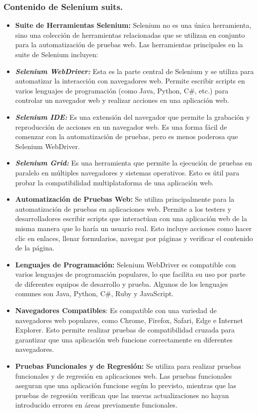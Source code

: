 \documentclass[letterpaper]{article}
\begin{document}
\subsubsection{Contenido de Selenium suits.}
\begin{itemize}[series=listWWNumxii,]
\item \textbf{Suite de Herramientas Selenium:} Selenium no es una única herramienta, sino una colección de herramientas
relacionadas que se utilizan en conjunto para la automatización de pruebas web. Las herramientas principales en la
suite de Selenium incluyen:
\item \textbf{\textit{Selenium WebDriver: }}Esta es la parte central de Selenium y se utiliza para automatizar la
interacción con navegadores web. Permite escribir scripts en varios lenguajes de programación (como Java, Python, C\#,
etc.) para controlar un navegador web y realizar acciones en una aplicación web.
\item \textbf{\textit{Selenium IDE: }}Es una extensión del navegador que permite la grabación y reproducción de acciones
en un navegador web. Es una forma fácil de comenzar con la automatización de pruebas, pero es menos poderosa que
Selenium WebDriver.
\item \textbf{\textit{Selenium Grid: }}Es una herramienta que permite la ejecución de pruebas en paralelo en múltiples
navegadores y sistemas operativos. Esto es útil para probar la compatibilidad multiplataforma de una aplicación web.
\item \textbf{Automatización de Pruebas Web:} Se utiliza principalmente para la automatización de pruebas en
aplicaciones web. Permite a los testers y desarrolladores escribir scripts que interactúan con una aplicación web de la
misma manera que lo haría un usuario real. Esto incluye acciones como hacer clic en enlaces, llenar formularios,
navegar por páginas y verificar el contenido de la página.
\item \textbf{Lenguajes de Programación:} Selenium WebDriver es compatible con varios lenguajes de programación
populares, lo que facilita su uso por parte de diferentes equipos de desarrollo y prueba. Algunos de los lenguajes
comunes son Java, Python, C\#, Ruby y JavaScript.
\item \textbf{Navegadores Compatibles}: Es compatible con una variedad de navegadores web populares, como Chrome,
Firefox, Safari, Edge e Internet Explorer. Esto permite realizar pruebas de compatibilidad cruzada para garantizar que
una aplicación web funcione correctamente en diferentes navegadores.
\item \textbf{Pruebas Funcionales y de Regresión:} Se utiliza para realizar pruebas funcionales y de regresión en
aplicaciones web. Las pruebas funcionales aseguran que una aplicación funcione según lo previsto, mientras que las
pruebas de regresión verifican que las nuevas actualizaciones no hayan introducido errores en áreas previamente
funcionales.
\end{itemize}
\end{document}
